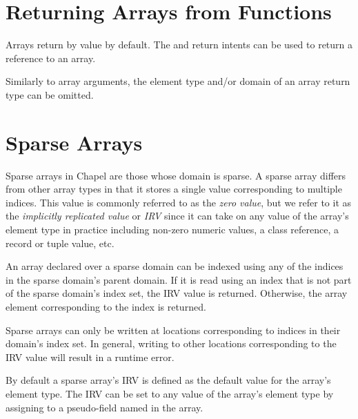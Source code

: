\section{Returning Arrays from Functions}
\label{Returning_Arrays_from_Functions}

Arrays return by value by default. The  and 
return intents can be used to return a reference to an array.

Similarly to array arguments, the element type and/or domain of an array return
type can be omitted.


\section{Sparse Arrays}
\label{Sparse_Arrays}

Sparse arrays in Chapel are those whose domain is sparse.  A
sparse array differs from other array types in that it stores a single
value corresponding to multiple indices.  This value is commonly
referred to as the \emph{zero value}, but we refer to it as the
\emph{implicitly replicated value} or \emph{IRV} since it can take
on any value of the array's element type in practice including
non-zero numeric values, a class reference, a record or tuple value,
etc.

An array declared over a sparse domain can be indexed using any of the
indices in the sparse domain's parent domain.  If it is read using an
index that is not part of the sparse domain's index set, the IRV value
is returned.  Otherwise, the array element corresponding to the index
is returned.

Sparse arrays can only be written at locations corresponding to
indices in their domain's index set.  In general, writing to other
locations corresponding to the IRV value will result in a runtime
error.

By default a sparse array's IRV is defined as the default value for
the array's element type.  The IRV can be set to any value of the
array's element type by assigning to a pseudo-field named 
in the array.

